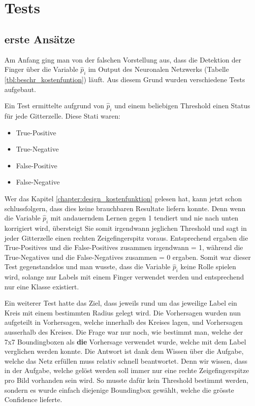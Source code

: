 \newpage
\section{Tests} 
\label{chapter:tests}
\subsection{erste Ansätze}
Am Anfang ging man von der falschen Vorstellung aus, dass die Detektion der Finger über die Variable $\hat{p}_i$ im Output des Neuronalen Netzwerks (Tabelle \ref{tbl:beschr_kostenfuntion}) läuft. 
Aus diesem Grund wurden verschiedene Tests aufgebaut.

Ein Test ermittelte aufgrund von $\hat{p}_i$ und einem beliebigen Threshold einen Status für jede Gitterzelle. Diese Stati waren: 

\begin{itemize}
\item \grqq{}True-Positive\grqq{}
\item \grqq{}True-Negative\grqq{}
\item \grqq{}False-Positive\grqq{}
\item \grqq{}False-Negative\grqq{}
\end{itemize}

Wer das Kapitel \ref{chapter:design_kostenfunktion} gelesen hat, kann jetzt schon schlussfolgern, dass dies keine brauchbaren Resultate liefern konnte.
Denn wenn die Variable $\hat{p}_i$ mit andauerndem Lernen gegen 1 tendiert und nie nach unten korrigiert wird, übersteigt Sie somit irgendwann jeglichen Threshold und sagt in jeder Gitterzelle einen rechten Zeigefingerspitz voraus. 
Entsprechend ergaben die \grqq{}True-Positives\grqq{} und die \grqq{}False-Positives\grqq{} zusammen irgendwann = 1, während die \grqq{}True-Negatives\grqq{} und die \grqq{}False-Negatives\grqq{} zusammen = 0 ergaben.
Somit war dieser Test gegenstandslos und man wusste, dass die Variable $\hat{p}_i$ keine Rolle spielen wird, solange nur Labels mit einem Finger verwendet werden und entsprechend nur eine Klasse existiert.

Ein weiterer Test hatte das Ziel, dass jeweils rund um das jeweilige Label ein Kreis mit einem bestimmten Radius gelegt wird.
Die Vorhersagen wurden nun aufgeteilt in Vorhersagen, welche innerhalb des Kreises lagen, und Vorhersagen ausserhalb des Kreises.
Die Frage war nur noch, wie bestimmt man, welche der 7x7 Boundingboxen als \textbf{die} Vorhersage verwendet wurde, welche mit dem Label verglichen werden konnte.
Die Antwort ist dank dem Wissen über die Aufgabe, welche das Netz erfüllen muss relativ schnell beantwortet.
Denn wir wissen, dass in der Aufgabe, welche gelöst werden soll immer nur eine rechte Zeigefingerspitze pro Bild vorhanden sein wird.
So musste dafür kein Threshold bestimmt werden, sondern es wurde einfach diejenige Boundingbox gewählt, welche die grösste Confidence lieferte.

